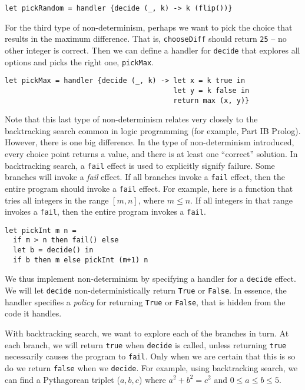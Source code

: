 \begin{verbatim}
let pickRandom = handler {decide (_, k) -> k (flip())}
\end{verbatim}

For the third type of non-determinism, perhaps we want to pick the choice that results in the maximum difference. That is, \texttt{chooseDiff} should return \texttt{25} -- no other integer is correct. Then we can define a handler for \texttt{decide} that explores all options and picks the right one, \texttt{pickMax}.

\begin{verbatim}
let pickMax = handler {decide (_, k) -> let x = k true in
                                        let y = k false in
                                        return max (x, y)}
\end{verbatim}

Note that this last type of non-determinism relates very closely to the backtracking search common in logic programming (for example, \textsf{Part IB Prolog}). However, there is one big difference. In the type of non-determinism introduced, every choice point returns a value, and there is at least one ``correct'' solution. In backtracking search, a \texttt{fail} effect is used to explicitly signify failure. Some branches will invoke a \textit{fail} effect. If all branches invoke a \texttt{fail} effect, then the entire program should invoke a \texttt{fail} effect. For example, here is a function that tries all integers in the range $[m, n]$, where $m \leq n$. If all integers in that range invokes a \texttt{fail}, then the entire program invokes a \texttt{fail}. 

\begin{verbatim}
let pickInt m n =
  if m > n then fail() else
  let b = decide() in 
  if b then m else pickInt (m+1) n
\end{verbatim}

We thus implement non-determinism by specifying a handler for a \texttt{decide} effect. We will let \texttt{decide} non-deterministically return \texttt{True} or \texttt{False}. In essence, the handler specifies a \textit{policy} for returning \texttt{True} or \texttt{False}, that is hidden from the code it handles. 

With backtracking search, we want to explore each of the branches in turn. At each branch, we will return \texttt{true} when \texttt{decide} is called, unless returning \texttt{true} necessarily causes the program to \texttt{fail}. Only when we are certain that this is so do we return \texttt{false} when we \texttt{decide}. For example, using backtracking search, we can find a Pythagorean triplet ($a, b, c$) where $a^2 + b^2 = c^2$ and $0 \leq a \leq b \leq 5$.

